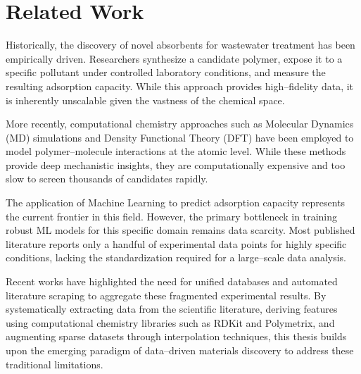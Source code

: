 \section{Related Work }
\label{sec:related_work}

Historically, the discovery of novel absorbents for wastewater treatment has been empirically driven. Researchers synthesize a candidate polymer, expose it to a specific pollutant under controlled laboratory conditions, and measure the resulting adsorption capacity. While this approach provides high--fidelity data, it is inherently unscalable given the vastness of the chemical space.

More recently, computational chemistry approaches such as Molecular Dynamics (MD) simulations \cite{MDPolymerMoleculeInteraction} and Density Functional Theory (DFT) \cite{DFTPolymerStructure} have been employed to model polymer--molecule interactions at the atomic level. While these methods provide deep mechanistic insights, they are computationally expensive and too slow to screen thousands of candidates rapidly.

The application of Machine Learning to predict adsorption capacity represents the current frontier in this field. However, the primary bottleneck in training robust ML models for this specific domain remains data scarcity. Most published literature reports only a handful of experimental data points for highly specific conditions, lacking the standardization required for a large--scale data analysis.

Recent works have highlighted the need for unified databases and automated literature scraping to aggregate these fragmented experimental results. By systematically extracting data from the scientific literature, deriving features using computational chemistry libraries such as RDKit and Polymetrix\cite{polymetrix},  and augmenting sparse datasets through interpolation techniques, this thesis builds upon the emerging paradigm of data--driven materials discovery to address these traditional limitations.
